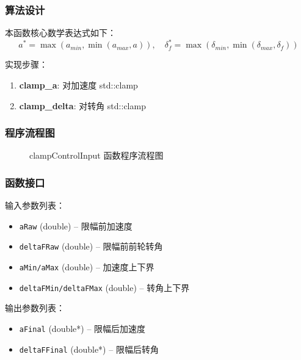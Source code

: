 \documentclass[a4paper,10pt]{article}
\begin{document}
\subsubsection{算法设计}
\par 本函数核心数学表达式如下：
\begin{equation}
a^* = \max(a_{min}, \min(a_{max}, a)),\quad \delta^*_f = \max(\delta_{min}, \min(\delta_{max}, \delta_f))
\end{equation}
\par 实现步骤：
\begin{enumerate}
  \item \textbf{clamp\_a}: 对加速度 std::clamp
  \item \textbf{clamp\_delta}: 对转角 std::clamp
\end{enumerate}
\subsubsection{程序流程图}
\begin{figure}[h]
    \centering
    \caption{clampControlInput 函数程序流程图}
    \label{fig:flow_clampControlInput}
\end{figure}
\subsubsection{函数接口}
\par 输入参数列表：
\begin{itemize}
  \item \texttt{aRaw} (double) -- 限幅前加速度
  \item \texttt{deltaFRaw} (double) -- 限幅前前轮转角
  \item \texttt{aMin/aMax} (double) -- 加速度上下界
  \item \texttt{deltaFMin/deltaFMax} (double) -- 转角上下界
\end{itemize}
\par 输出参数列表：
\begin{itemize}
  \item \texttt{aFinal} (double*) -- 限幅后加速度
  \item \texttt{deltaFFinal} (double*) -- 限幅后转角
\end{itemize}
\end{document}
